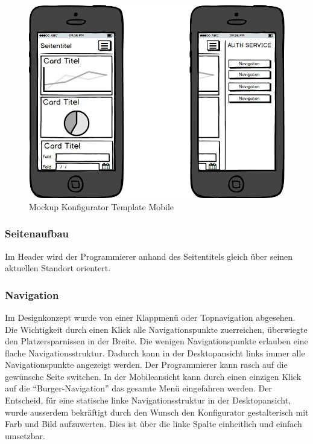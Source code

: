 \newpage

\begin{figure}[htbp]
\centering
\includegraphics{images/mockups/Mobile.png}
\caption{Mockup Konfigurator Template Mobile}
\end{figure}

\subsubsection{Seitenaufbau}\label{seitenaufbau}

Im Header wird der Programmierer anhand des Seitentitels gleich über
seinen aktuellen Standort orientert.

\subsubsection{Navigation}\label{navigation}

Im Designkonzept wurde von einer Klappmenü oder Topnavigation abgesehen.
Die Wichtigkeit durch einen Klick alle Navigationspunkte zuerreichen,
überwiegte den Platzersparnissen in der Breite. Die wenigen
Navigationspunkte erlauben eine flache Navigationsstruktur. Dadurch kann
in der Desktopansicht links immer alle Navigationspunkte angezeigt
werden. Der Programmierer kann rasch auf die gewünsche Seite switchen.
In der Mobileansicht kann durch einen einzigen Klick auf die
``Burger-Navigation'' das gesamte Menü eingefahren werden. Der
Entscheid, für eine statische linke Navigationsstruktur in der
Desktopansicht, wurde ausserdem bekräftigt durch den Wunsch den
Konfigurator gestalterisch mit Farb und Bild aufzuwerten. Dies ist über
die linke Spalte einheitlich und einfach umsetzbar.


